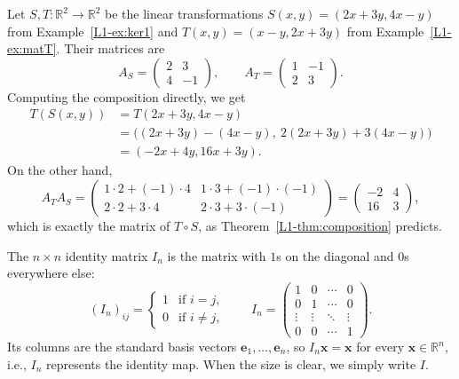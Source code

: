 \begin{example}
    Let $S, T: \mathbb{R}^2 \to \mathbb{R}^2$ be the linear transformations $S(x, y) = (2x + 3y, 4x - y)$ from Example~\ref{L1-ex:ker1} and $T(x, y) = (x - y, 2x + 3y)$ from Example~\ref{L1-ex:matT}. Their matrices are
    \[A_S = \begin{pmatrix}
        2 & 3 \\
        4 & -1
    \end{pmatrix}, \qquad A_T = \begin{pmatrix}
        1 & -1 \\
        2 & 3
    \end{pmatrix}.\]
    Computing the composition directly, we get
    \begin{align*}
        T(S(x, y)) &= T(2x + 3y, 4x - y) \\
        &= \big((2x + 3y) - (4x - y), \ 2(2x + 3y) + 3(4x - y)\big) \\
        &= (-2x + 4y, 16x + 3y).
    \end{align*}
    On the other hand,
    \[A_T A_S = \begin{pmatrix}
        1 \cdot 2 + (-1) \cdot 4 & 1 \cdot 3 + (-1) \cdot (-1) \\
        2 \cdot 2 + 3 \cdot 4 & 2 \cdot 3 + 3 \cdot (-1)
    \end{pmatrix} = \begin{pmatrix}
        -2 & 4 \\
        16 & 3
    \end{pmatrix},\]
    which is exactly the matrix of $T \circ S$, as Theorem~\ref{L1-thm:composition} predicts.
\end{example}

\begin{definition}
    The $n \times n$ identity matrix $I_n$ is the matrix with $1$s on the diagonal and $0$s everywhere else:
    \[(I_n)_{ij} = \begin{cases}
        1 & \text{if } i = j, \\
        0 & \text{if } i \neq j,
    \end{cases} \qquad I_n = \begin{pmatrix}
        1 & 0 & \cdots & 0 \\
        0 & 1 & \cdots & 0 \\
        \vdots & \vdots & \ddots & \vdots \\
        0 & 0 & \cdots & 1
    \end{pmatrix}.\]
    Its columns are the standard basis vectors $\mathbf{e}_1, \ldots, \mathbf{e}_n$, so $I_n \mathbf{x} = \mathbf{x}$ for every $\mathbf{x} \in \mathbb{R}^n$, i.e., $I_n$ represents the identity map. When the size is clear, we simply write $I$.
\end{definition}

